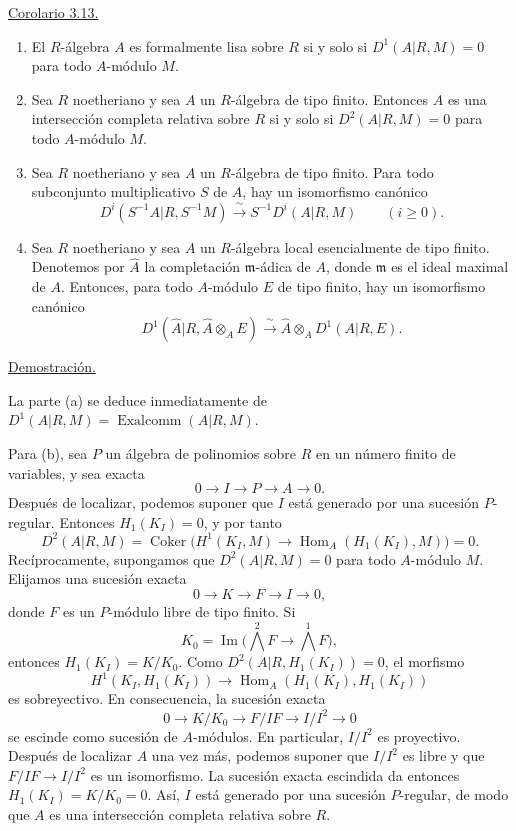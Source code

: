 
\underline{Corolario 3.13.}

\begin{enumerate}[label=(\alph*)]
\item El $R$-álgebra $A$ es formalmente lisa sobre $R$ si y solo si
$D^1(A|R,M)=0$ para todo $A$-módulo $M$.

\item Sea $R$ noetheriano y sea $A$ un $R$-álgebra de tipo finito.
Entonces $A$ es una intersección completa relativa sobre $R$ si y solo
si $D^2(A|R,M)=0$ para todo $A$-módulo $M$.

\item Sea $R$ noetheriano y sea $A$ un $R$-álgebra de tipo finito.
Para todo subconjunto multiplicativo $S$ de $A$, hay un isomorfismo
canónico
\[
 D^i(S^{-1}A|R,S^{-1}M)
 \xrightarrow{\ \sim\ }S^{-1}D^i(A|R,M)
 \qquad(i\geq0).
\]

\item Sea $R$ noetheriano y sea $A$ un $R$-álgebra local
esencialmente de tipo finito. Denotemos por $\widehat A$ la
completación $\mathfrak m$-ádica de $A$, donde $\mathfrak m$ es el
ideal maximal de $A$. Entonces, para todo $A$-módulo $E$ de tipo
finito, hay un isomorfismo canónico
\[
 D^1(\widehat A|R,\widehat A\otimes_AE)
 \xrightarrow{\ \sim\ }
 \widehat A\otimes_AD^1(A|R,E).
\]
\end{enumerate}

\underline{Demostración.}

La parte (a) se deduce inmediatamente de
$D^1(A|R,M)=\operatorname{Exalcomm}(A|R,M)$.

Para (b), sea $P$ un álgebra de polinomios sobre $R$ en un número
finito de variables, y sea exacta
\[
 0\longrightarrow I\longrightarrow P\longrightarrow A
 \longrightarrow0.
\]
Después de localizar, podemos suponer que $I$ está generado por una
sucesión $P$-regular. Entonces $H_1(K_I)=0$, y por tanto
\[
 D^2(A|R,M)
 =\operatorname{Coker}\bigl(
 H^1(K_I,M)\longrightarrow
 \operatorname{Hom}_A(H_1(K_I),M)\bigr)=0.
\]
Recíprocamente, supongamos que $D^2(A|R,M)=0$ para todo $A$-módulo
$M$. Elijamos una sucesión exacta
\[
 0\longrightarrow K\longrightarrow F\longrightarrow I
 \longrightarrow0,
\]
donde $F$ es un $P$-módulo libre de tipo finito. Si
\[
 K_0=\operatorname{Im}\bigl(\textstyle\bigwedge^2F
 \longrightarrow\bigwedge^1F\bigr),
\]
entonces $H_1(K_I)=K/K_0$. Como
$D^2(A|R,H_1(K_I))=0$, el morfismo
\[
 H^1(K_I,H_1(K_I))
 \longrightarrow
 \operatorname{Hom}_A(H_1(K_I),H_1(K_I))
\]
es sobreyectivo. En consecuencia, la sucesión exacta
\[
 0\longrightarrow K/K_0\longrightarrow F/IF
 \longrightarrow I/I^2\longrightarrow0
\]
se escinde como sucesión de $A$-módulos. En particular, $I/I^2$ es
proyectivo. Después de localizar $A$ una vez más, podemos suponer que
$I/I^2$ es libre y que $F/IF\longrightarrow I/I^2$ es un
isomorfismo. La sucesión exacta escindida da entonces
$H_1(K_I)=K/K_0=0$. Así, $I$ está generado por una sucesión
$P$-regular, de modo que $A$ es una intersección completa relativa
sobre $R$.

